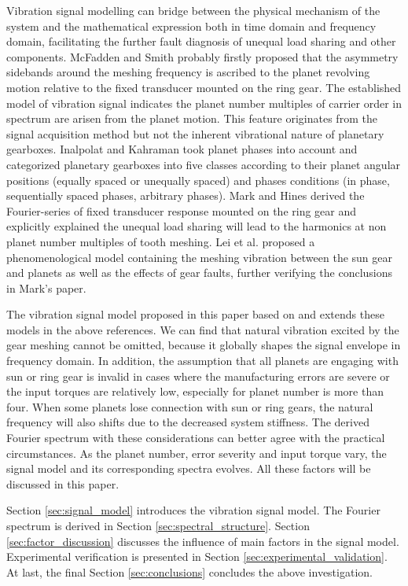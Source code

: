 \documentclass[a4paper,fleqn]{cas-sc}%
\begin{document}
\par Vibration signal modelling can bridge between the physical mechanism of the system and the mathematical expression both in time domain and frequency domain, facilitating the further fault diagnosis of unequal load sharing and other components. McFadden and Smith \cite{McFadden1985} probably firstly proposed that the asymmetry sidebands around the meshing frequency is ascribed to the planet revolving motion relative to the fixed transducer mounted on the ring gear. The established model of vibration signal indicates the planet number multiples of carrier order in spectrum are arisen from the planet motion. This feature originates from the signal acquisition method but not the inherent vibrational nature of planetary gearboxes. Inalpolat and Kahraman \cite{Inalpolat2009} took planet phases into account and categorized planetary gearboxes into five classes according to their planet angular positions (equally spaced or unequally spaced) and phases conditions (in phase, sequentially spaced phases, arbitrary phases). Mark and Hines \cite{Mark2009} derived the Fourier-series of fixed transducer response mounted on the ring gear and explicitly explained the unequal load sharing will lead to the harmonics at non planet number multiples of tooth meshing. Lei \cite{Lei2016} et al. proposed a phenomenological model containing the meshing vibration between the sun gear and planets as well as the effects of gear faults, further verifying the conclusions in Mark's paper.
\par The vibration signal model proposed in this paper based on and extends these models in the above references. We  can find that natural vibration excited by the gear meshing cannot be omitted, because it globally shapes the signal envelope in frequency domain. In addition, the assumption that all planets are engaging with sun or ring gear is invalid in cases where the manufacturing errors are severe or the input torques are relatively low, especially for planet number is more than four. When some planets lose connection with sun or ring gears, the natural frequency will also shifts due to the decreased system stiffness. The derived Fourier spectrum with these considerations can better agree with the practical circumstances. As the planet number, error severity and input torque vary, the signal model and its corresponding spectra evolves. All these factors will be discussed in this paper.
\par Section \ref{sec:signal_model} introduces the vibration signal model. The Fourier spectrum is derived in Section \ref{sec:spectral_structure}. Section \ref{sec:factor_discussion} discusses the influence of main factors in the signal model. Experimental verification is presented in Section \ref{sec:experimental_validation}. At last, the final Section \ref{sec:conclusions} concludes the above investigation. 
\end{document}
